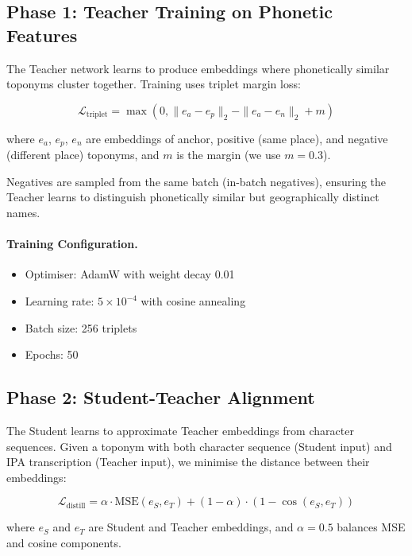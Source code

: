 \documentclass[11pt,a4paper]{article}
\begin{document}
\subsection{Phase 1: Teacher Training on Phonetic Features}

The Teacher network learns to produce embeddings where phonetically similar toponyms cluster together. Training uses triplet margin loss:

\begin{equation}
\mathcal{L}_{\text{triplet}} = \max(0, \|e_a - e_p\|_2 - \|e_a - e_n\|_2 + m)
\end{equation}

where $e_a$, $e_p$, $e_n$ are embeddings of anchor, positive (same place), and negative (different place) toponyms, and $m$ is the margin (we use $m = 0.3$).

Negatives are sampled from the same batch (in-batch negatives), ensuring the Teacher learns to distinguish phonetically similar but geographically distinct names.

\paragraph{Training Configuration.}
\begin{itemize}
    \item Optimiser: AdamW with weight decay 0.01
    \item Learning rate: $5 \times 10^{-4}$ with cosine annealing
    \item Batch size: 256 triplets
    \item Epochs: 50
\end{itemize}

\subsection{Phase 2: Student-Teacher Alignment}

The Student learns to approximate Teacher embeddings from character sequences. Given a toponym with both character sequence (Student input) and IPA transcription (Teacher input), we minimise the distance between their embeddings:

\begin{equation}
\mathcal{L}_{\text{distill}} = \alpha \cdot \text{MSE}(e_S, e_T) + (1 - \alpha) \cdot (1 - \cos(e_S, e_T))
\end{equation}

where $e_S$ and $e_T$ are Student and Teacher embeddings, and $\alpha = 0.5$ balances MSE and cosine components.
\end{document}
